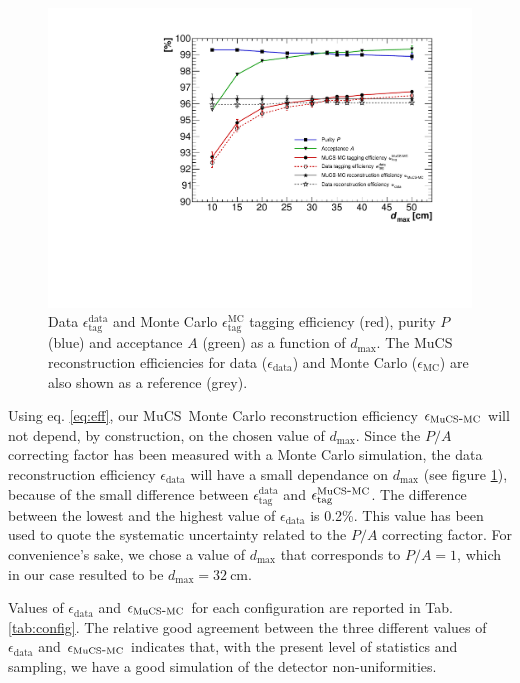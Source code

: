 \documentclass[a4paper]{scrartcl}
\def\myhyphen{{\hbox{-}}}
\begin{document}
\begin{figure}[htbp]
  \begin{center}
    \includegraphics[width=0.7\linewidth]{figures/purity.pdf}
    \caption{Data $\epsilon^{\mathrm{data}}_{\mathrm{tag}}$ and Monte Carlo $\epsilon^{\mathrm{MC}}_{\mathrm{tag}}$ tagging efficiency (red), purity $P$ (blue) and acceptance $A$ (green) as a function of $d_{\mathrm{max}}$. The MuCS reconstruction efficiencies for data ($\epsilon_{\mathrm{data}}$) and Monte Carlo ($\epsilon_{\mathrm{MC}}$) are also shown as a reference (grey).} \label{fig:purity}
  \end{center}
\end{figure}

Using eq. \eqref{eq:eff}, our MuCS Monte Carlo reconstruction efficiency $\epsilon_{\mathrm{MuCS\myhyphen MC}}$ will not depend, by construction, on the chosen value of $d_{\mathrm{max}}$. Since the $P/A$ correcting factor has been measured with a Monte Carlo simulation, the data reconstruction efficiency $\epsilon_{\mathrm{data}}$ will have a small dependance on $d_{\mathrm{max}}$ (see figure \ref{fig:purity}), because of the small difference between $\epsilon^{\mathrm{data}}_{\mathrm{tag}}$ and $\epsilon^{\mathrm{MuCS\myhyphen MC}}_{\mathrm{tag}}$.
The difference between the lowest and the highest value of $\epsilon_{\mathrm{data}}$ is 0.2\%. This value has been used to quote the systematic uncertainty related to the $P/A$ correcting factor.
For convenience's sake, we chose a value of $d_{\mathrm{max}}$ that corresponds to $P/A = 1$, which in our case resulted to be $d_{\mathrm{max}}=32~\mathrm{cm}$.

Values of $\epsilon_{\mathrm{data}}$ and $\epsilon_{\mathrm{MuCS\myhyphen MC}}$ for each configuration are reported in Tab. \ref{tab:config}. The relative good agreement between the three different values of $\epsilon_{\mathrm{data}}$ and $\epsilon_{\mathrm{MuCS\myhyphen MC}}$ indicates that, with the present level of statistics and sampling, we have a good simulation of the detector non-uniformities.
\end{document}
